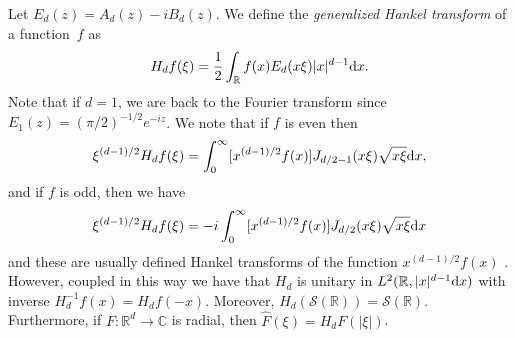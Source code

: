 \documentclass[a4paper,reqno,12pt]{amsart}
\renewcommand{\S}{\mathcal{S}}
\renewcommand{\r}{\mathbb{R}}
\newcommand{\cp}{\mathbb{C}} %
\newcommand{\ft}{\widehat}
\renewcommand{\d}{{\rm d}}
\begin{document}
Let $E_d(z)=A_d(z)-iB_d(z)$. We define the \textit{generalized Hankel transform} of a function~$f$ as
$$
H_d f(\xi) = \frac12 \int_\r f(x)E_d(x\xi)|x|^{d-1}\d x.
$$
Note that if $d=1$, we are back to the Fourier transform since $E_{1}(z)=(\pi/2)^{-1/2}e^{-iz}$. We note that if $f$ is even then
$$
\xi^{(d-1)/2}H_d f(\xi) = \int_0^\infty [x^{(d-1)/2}f(x)]J_{d/2-1}(x\xi)\sqrt{x\xi}\d x,
$$
and if $f$ is odd, then we have
$$
\xi^{(d-1)/2}H_d f(\xi) = -i\int_0^\infty [x^{(d-1)/2}f(x)]J_{d/2}(x\xi)\sqrt{x\xi}\d x
$$
and these are usually defined Hankel transforms of the function $x^{(d-1)/2}f(x)$ \cite{W}. However, coupled in this way we have that $H_d$ is unitary in $L^2(\r, |x|^{d-1} \d x)$ with inverse $H_d^{-1}f(x)=H_d f(-x)$.
Moreover, $H_d(\S(\r))=\S(\r)$. Furthermore, if $F:\r^d\to\cp$ is radial, then $\ft F(\xi) = H_{d}F(|\xi|)$. 
\end{document}
